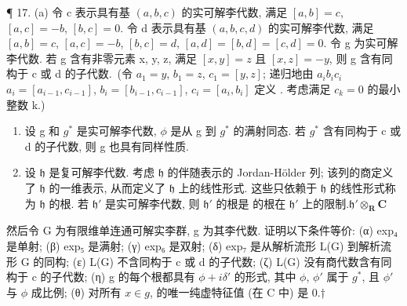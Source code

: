 ¶ 17. (a) 令 c 表示具有基 \((a, b, c)\) 的实可解李代数, 满足 \([a, b] = c\), \([a, c] = -b\), \([b, c] = 0\). 令 d 表示具有基 \((a, b, c, d)\) 的实可解李代数, 满足 \([a, b] = c\), \([a, c] = -b\), \([b, c] = d\), \([a, d] = [b, d] = [c, d] = 0\). 令 g 为实可解李代数. 若 g 含有非零元素 x, y, z, 满足 \([x, y] = z\) 且 \([x, z] = -y\), 则 g 含有同构于 c 或 d 的子代数.~(令 \(a_{1} = y\), \(b_{1} = z\), \(c_{1} = [y, z]\); 递归地由 \(a_{i}\)\(b_{i}\)\(c_{i}\)\(a_{i} = [a_{i-1}, c_{i-1}]\), \(b_{i} = [b_{i-1}, c_{i-1}]\), \(c_{i} = [a_{i}, b_{i}]\) 定义 . 考虑满足 \(c_{k} = 0\) 的最小整数 k.)

\begin{enumerate}
\def\labelenumi{(\alph{enumi})}
\setcounter{enumi}{1}
\item
  设 g 和 \(g^{*}\) 是实可解李代数, \(\phi\) 是从 g 到 \(g^{*}\) 的满射同态. 若 \(g^{*}\) 含有同构于 c 或 d 的子代数, 则 g 也具有同样性质.
\item
  设 \(\mathfrak{h}\) 是复可解李代数. 考虑 \(\mathfrak{h}\) 的伴随表示的 Jordan-Hölder 列; 该列的商定义了 \(\mathfrak{h}\) 的一维表示, 从而定义了 \(\mathfrak{h}\) 上的线性形式. 这些只依赖于 \(\mathfrak{h}\) 的线性形式称为 \(\mathfrak{h}\) 的根. 若 \(\mathfrak{h}'\) 是实可解李代数, 则 \(\mathfrak{h}'\) 的根是  的根在 \(\mathfrak{h}'\) 上的限制.\(\mathfrak{h}' \otimes_{\mathbf{R}} \mathbf{C}\)
\end{enumerate}

然后令 G 为有限维单连通可解实李群, g 为其李代数. 证明以下条件等价: (α) exp₄ 是单射; (β) exp₅ 是满射; (γ) exp₆ 是双射; (δ) exp₇ 是从解析流形 L(G) 到解析流形 G 的同构; (ε) L(G) 不含同构于 c 或 d 的子代数; (ζ) L(G) 没有商代数含有同构于 c 的子代数; (η) g 的每个根都具有 \(\phi + i\delta'\) 的形式, 其中 \(\phi\), \(\phi'\) 属于 \(g^*\), 且 \(\phi'\) 与 \(\phi\) 成比例; (θ) 对所有 \(x \in g\),  的唯一纯虚特征值 (在 C 中) 是 0.†
